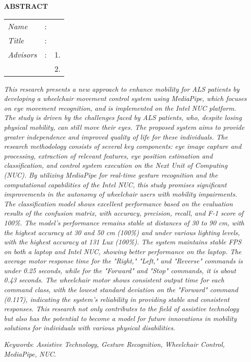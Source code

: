\begin{center}
  \large\textbf{ABSTRACT}
\end{center}


\vspace{2ex}

\begingroup
\setlength{\tabcolsep}{0pt}

\noindent
\begin{tabularx}{\textwidth}{l >{\centering}m{3em} X}
  \emph{Name}     & : & \name{}         \\

  \emph{Title}    & : & \engtatitle{}   \\

  \emph{Advisors} & : & 1. \advisor{}   \\
                  &   & 2. \coadvisor{} \\
\end{tabularx}
\endgroup

\emph{This research presents a new approach to enhance mobility for ALS patients by developing a wheelchair movement control system using MediaPipe, which focuses on eye movement recognition, and is implemented on the Intel NUC platform. The study is driven by the challenges faced by ALS patients, who, despite losing physical mobility, can still move their eyes. The proposed system aims to provide greater independence and improved quality of life for these individuals. The research methodology consists of several key components: eye image capture and processing, extraction of relevant features, eye position estimation and classification, and control system execution on the Next Unit of Computing (NUC). By utilizing MediaPipe for real-time gesture recognition and the computational capabilities of the Intel NUC, this study promises significant improvements in the autonomy of wheelchair users with mobility impairments. The classification model shows excellent performance based on the evaluation results of the confusion matrix, with accuracy, precision, recall, and F-1 score of 100\%. The model's performance remains stable at distances of 30 to 90 cm, with the highest accuracy at 30 and 50 cm (100\%) and under various lighting levels, with the highest accuracy at 131 Lux (100\%). The system maintains stable FPS on both a laptop and Intel NUC, showing better performance on the laptop. The average motor response time for the "Right," "Left," and "Reverse" commands is under 0.25 seconds, while for the "Forward" and "Stop" commands, it is about 0.43 seconds. The wheelchair motor shows consistent output time for each command class, with the lowest standard deviation on the "Forward" command (0.117), indicating the system's reliability in providing stable and consistent responses. This research not only contributes to the field of assistive technology but also has the potential to become a model for future innovations in mobility solutions for individuals with various physical disabilities.}

\emph{Keywords}: \emph{Assistive Technology, Gesture Recognition, Wheelchair Control, MediaPipe, NUC}.